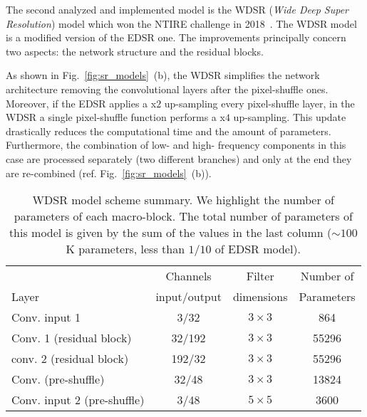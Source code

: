 \documentclass{standalone}
\begin{document}
The second analyzed and implemented model is the WDSR (\emph{Wide Deep Super Resolution}) model which won the NTIRE challenge in 2018~\cite{wdsr}.
The WDSR model is a modified version of the EDSR one.
The improvements principally concern two aspects: the network structure and the residual blocks.

As shown in Fig.~\ref{fig:sr_models}~(b), the WDSR simplifies the network architecture removing the convolutional layers after the pixel-shuffle ones.
Moreover, if the EDSR applies a x$2$ up-sampling every pixel-shuffle layer, in the WDSR a single pixel-shuffle function performs a x$4$ up-sampling.
This update drastically reduces the computational time and the amount of parameters.
Furthermore, the combination of low- and high- frequency components in this case are processed separately (two different branches) and only at the end they are re-combined (ref. Fig.~\ref{fig:sr_models}~(b)).

\begin{table}[htbp]
\centering
\begin{tabular}{lccc}
\hline \rowcolor{darkgrayrow}
                            &  Channels     & Filter     & Number of    \\
\rowcolor{darkgrayrow}
Layer                       & input/output  & dimensions & Parameters   \\
\hline
Conv. input 1               & 3/32       & $3\times3$   & 864     \\
Conv. 1 (residual block)    & 32/192     & $3\times3$   & 55296   \\
conv. 2 (residual block)    & 192/32     & $3\times3$   & 55296   \\
Conv. (pre-shuffle)         & 32/48      & $3\times3$   & 13824   \\
Conv. input 2 (pre-shuffle) & 3/48       & $5\times5$   & 3600    \\
\hline
\end{tabular}
\caption{WDSR model scheme summary.
We highlight the number of parameters of each macro-block.
The total number of parameters of this model is given by the sum of the values in the last column ($\sim100$K parameters, less than $1/10$ of EDSR model).
}
\label{tab:wdsr}
\end{table}
\end{document}
